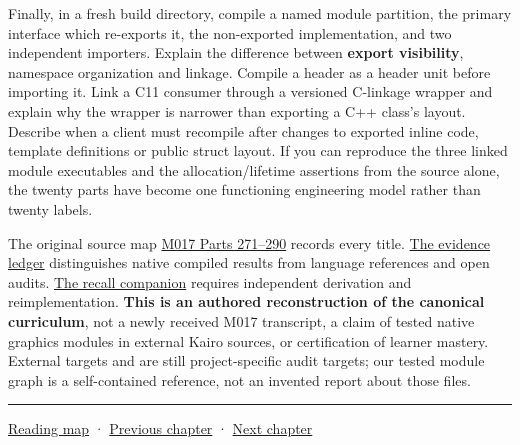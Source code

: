 Finally, in a fresh build directory, compile a named module partition, the primary interface which re-exports it, the non-exported implementation, and two independent importers. Explain the difference between \textbf{export visibility}, namespace organization and linkage. Compile a header as a header unit before importing it. Link a C11 consumer through a versioned C-linkage wrapper and explain why the wrapper is narrower than exporting a C++ class's layout. Describe when a client must recompile after changes to exported inline code, template definitions or public struct layout. If you can reproduce the three linked module executables and the allocation/lifetime assertions from the source alone, the twenty parts have become one functioning engineering model rather than twenty labels.

The original source map \hyperref[appendix-fd090d982a15-m017-parts-271290-lazy-asset-queries-allocation-lifetimes-and-compiled-api-boundaries]{M017 Parts 271--290} records every title. \hyperref[appendix-a103e7846d21-phase-7-additive-reconstruction-m017-parts-271290]{The evidence ledger} distinguishes native compiled results from language references and open audits. \hyperref[appendix-960160274237-from-borrowed-reports-to-module-boundaries-m017-reconstruction]{The recall companion} requires independent derivation and reimplementation. \textbf{This is an authored reconstruction of the canonical curriculum}, not a newly received M017 transcript, a claim of tested native graphics modules in external Kairo sources, or certification of learner mastery. External targets  and  are still project-specific audit targets; our tested module graph is a self-contained reference, not an invented report about those files.

\begin{center}\rule{0.5\linewidth}{0.5pt}\end{center}

\hyperref[volume-reading-map]{Reading map} · \hyperref[01-foundations-i-ch005-generic-asset-pipelines-without-hidden-contracts]{Previous chapter} · \hyperref[01-foundations-i-ch007-typed-interfaces-identity-and-data-structures]{Next chapter}
